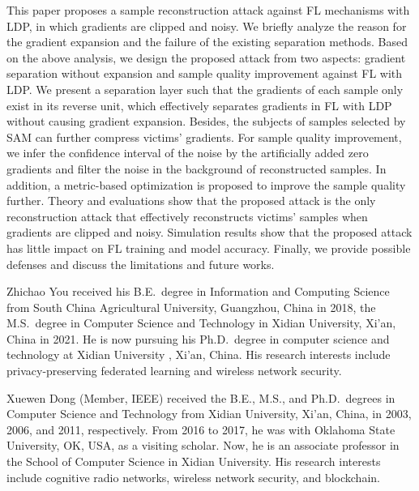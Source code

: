 \documentclass[lettersize,journal]{IEEEtran}
\begin{document}
This paper proposes a sample reconstruction attack against FL mechanisms with LDP, in which gradients are clipped and noisy. We briefly analyze the reason for the gradient expansion and the failure of the existing separation methods. Based on the above analysis, we design the proposed attack from two aspects: gradient separation without expansion and sample quality improvement against FL with LDP. We present a separation layer such that the gradients of each sample only exist in its reverse unit, which effectively separates gradients in FL with LDP without causing gradient expansion. Besides, the subjects of samples selected by SAM can further compress victims' gradients. For sample quality improvement, we infer the confidence interval of the noise by the artificially added zero gradients and filter the noise in the background of reconstructed samples. In addition, a metric-based optimization is proposed to improve the sample quality further. Theory and evaluations show that the proposed attack is the only reconstruction attack that effectively reconstructs victims' samples when gradients are clipped and noisy. Simulation results show that the proposed attack has little impact on FL training and model accuracy. Finally, we provide possible defenses and discuss the limitations and future works.




\begin{IEEEbiography}{Zhichao You} received his B.E.\ degree in Information and Computing Science from South China Agricultural University, Guangzhou, China in 2018, the M.S.\ degree in Computer Science and Technology in Xidian University, Xi'an, China in 2021. He is now pursuing his Ph.D.\ degree in computer science and technology at Xidian University , Xi'an, China. His research interests include privacy-preserving federated learning and wireless network security.
\end{IEEEbiography}

\begin{IEEEbiography}{Xuewen Dong} (Member, IEEE) received the B.E., M.S., and Ph.D.\ degrees in Computer Science and Technology from Xidian University, Xi'an, China, in 2003, 2006, and 2011, respectively. From 2016 to 2017, he was with Oklahoma State University, OK, USA, as a visiting scholar. Now, he is an associate professor in the School of Computer Science in Xidian University. His research interests include cognitive radio networks, wireless network security, and blockchain.
\end{IEEEbiography}
\end{document}
